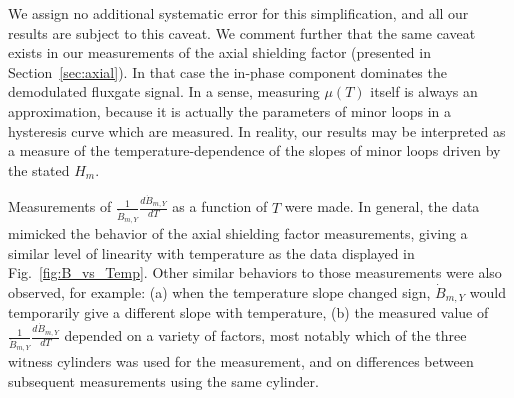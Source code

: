 We assign no additional systematic error for this simplification, and
all our results are subject to this caveat.  We comment further that
the same caveat exists in our measurements of the axial shielding
factor (presented in Section~\ref{sec:axial}).  In that case the
in-phase component dominates the demodulated fluxgate signal.  In a
sense, measuring $\mu(T)$ itself is always an approximation, because
it is actually the parameters of minor loops in a hysteresis curve
which are measured.  In reality, our results may be interpreted as a
measure of the temperature-dependence of the slopes of minor loops
driven by the stated $H_m$.

Measurements of $\frac{1}{\dot{B}_{m,Y}}\frac{d\dot{B}_{m,Y}}{dT}$ as
a function of $T$ were made.  In general, the data mimicked the
behavior of the axial shielding factor measurements, giving a similar
level of linearity with temperature as the data displayed in
Fig.~\ref{fig:B_vs_Temp}.  Other similar behaviors to those
measurements were also observed, for example: (a) when the temperature
slope changed sign, $\dot{B}_{m,Y}$ would temporarily give a different
slope with temperature, (b) the measured value of
$\frac{1}{\dot{B}_{m,Y}}\frac{d\dot{B}_{m,Y}}{dT}$ depended on a
variety of factors, most notably which of the three
witness cylinders was used for the measurement, and on differences
between subsequent measurements using the same cylinder.


